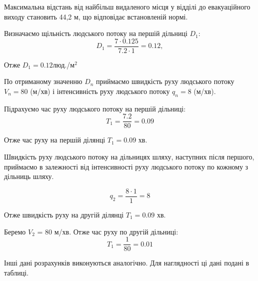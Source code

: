 \par Максимальна відстань від найбільш видаленого місця у відділі до евакуаційного виходу становить 44,2 м, що відповідає встановленій нормі.
\par Визначаємо щільність людського потоку на першій дільниці $D_{1}$:
	\begin{equation}
		D_{1}=\frac{7\cdot 0.125}{7.2\cdot 1}=0.12,
	\end{equation}

\par Отже $D_{1}=0.12$люд./$м^2$

\par По отриманому значенню $D_{n}$ приймаємо швидкість руху людського потоку $V_{n}=80$ (м/хв) і інтенсивність руху людського потоку $q_{n}=8$ (м/хв).
\par Підрахуємо час руху людського потоку на першій дільниці:
	\begin{equation}
		T_{1}=\frac{7.2}{80} = 0.09
	\end{equation}
\par Отже час руху на першій ділянці $T_{1} = 0.09$ хв.

\par Швидкість руху людського потоку на дільницях шляху, наступних після першого, приймаємо в залежності від інтенсивності руху людського потоку по кожному з дільниць шляху.

	\begin{equation}
		q_{2}=\frac{8\cdot 1}{1} = 8
	\end{equation}
\par Отже швидкість руху на другій ділянці $T_{1} = 0.09$ хв.


\par Беремо $V_{2}$ = 80 м/хв.
Отже час руху по другій дільниці:
	\begin{equation}
		T_{1}=\frac{1}{80} = 0.01
	\end{equation}

\par Інші дані розрахунків виконуються аналогічно. Для наглядності ці дані подані в таблиці.


